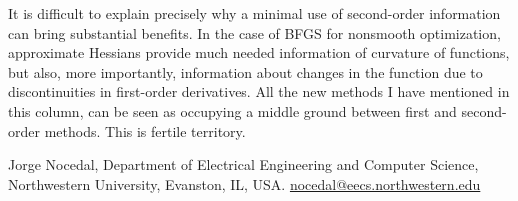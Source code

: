 \documentclass{optima}
\begin{document}
It is difficult to explain precisely why a minimal use of second-order information can
bring substantial benefits. In the case of BFGS for nonsmooth optimization,
approximate Hessians provide much needed information of curvature of functions, but
also, more importantly, information about changes in the function due to
discontinuities in first-order derivatives. All the new methods I have mentioned in
this column, can be seen as occupying a middle ground between first and second-order
methods. This is fertile territory.
   
 
\begin{jinfo}
Jorge Nocedal, Department of Electrical Engineering and Computer Science, Northwestern University, Evanston, IL,
USA. \href{mailto:nocedal@eecs.northwestern.edu}{\url{nocedal@eecs.northwestern.edu}}

\end{jinfo}
\end{document}
